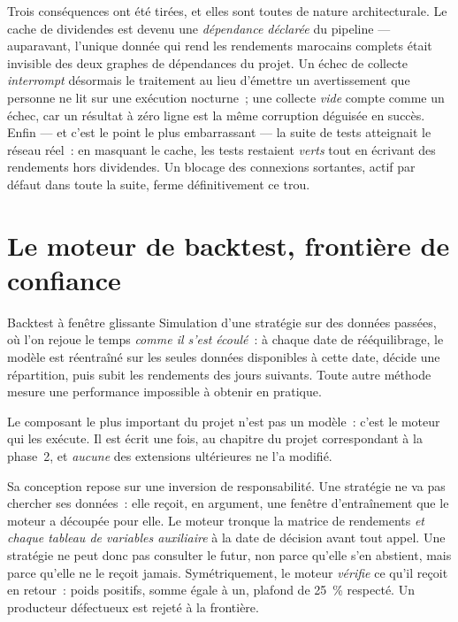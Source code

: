 Trois conséquences ont été tirées, et elles sont toutes de nature architecturale.
Le cache de dividendes est devenu une \emph{dépendance déclarée} du pipeline —
auparavant, l'unique donnée qui rend les rendements marocains complets était
invisible des deux graphes de dépendances du projet. Un échec de collecte
\emph{interrompt} désormais le traitement au lieu d'émettre un avertissement que
personne ne lit sur une exécution nocturne~; une collecte \emph{vide} compte comme
un échec, car un résultat à zéro ligne est la même corruption déguisée en succès.
Enfin — et c'est le point le plus embarrassant — la suite de tests atteignait le
réseau réel~: en masquant le cache, les tests restaient \emph{verts} tout en
écrivant des rendements hors dividendes. Un blocage des connexions sortantes,
actif par défaut dans toute la suite, ferme définitivement ce trou.

\section{Le moteur de backtest, frontière de confiance}

\begin{definitionbox}{Backtest à fenêtre glissante}
Simulation d'une stratégie sur des données passées, où l'on rejoue le temps
\emph{comme il s'est écoulé}~: à chaque date de rééquilibrage, le modèle est
réentraîné sur les seules données disponibles à cette date, décide une
répartition, puis subit les rendements des jours suivants. Toute autre méthode
mesure une performance impossible à obtenir en pratique.
\end{definitionbox}

Le composant le plus important du projet n'est pas un modèle~: c'est le moteur
qui les exécute. Il est écrit une fois, au chapitre du projet correspondant à la
phase~2, et \emph{aucune} des extensions ultérieures ne l'a modifié.

Sa conception repose sur une inversion de responsabilité. Une stratégie ne va pas
chercher ses données~: elle reçoit, en argument, une fenêtre d'entraînement que le
moteur a découpée pour elle. Le moteur tronque la matrice de rendements
\emph{et chaque tableau de variables auxiliaire} à la date de décision avant tout
appel. Une stratégie ne peut donc pas consulter le futur, non parce qu'elle
s'en abstient, mais parce qu'elle ne le reçoit jamais. Symétriquement, le moteur
\emph{vérifie} ce qu'il reçoit en retour~: poids positifs, somme égale à un,
plafond de 25~\% respecté. Un producteur défectueux est rejeté à la frontière.

